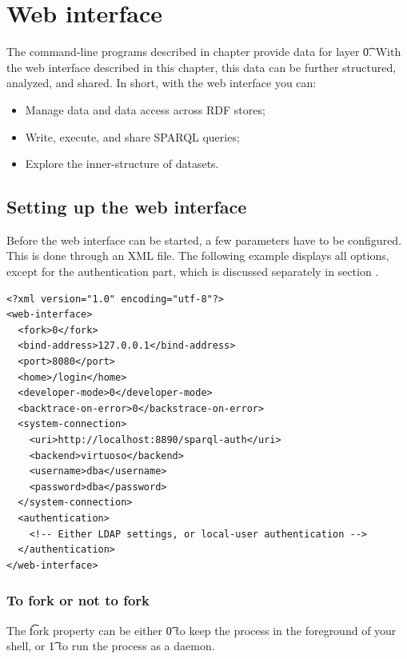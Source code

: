\chapter{Web interface}
\label{chap:web-interface}

  The command-line programs described in chapter 
  provide data for layer \t{0}.  With the web interface described in
  this chapter, this data can be further structured, analyzed, and shared.
  In short, with the web interface you can:
  \begin{itemize}
  \item Manage data and data access across RDF stores;
  \item Write, execute, and share SPARQL queries;
  \item Explore the inner-structure of datasets.
  \end{itemize}

\section{Setting up the web interface}
\label{sec:configuring-sg-web}

  Before the web interface can be started, a few parameters have to be
  configured.  This is done through an XML file.  The following example
  displays all options, except for the authentication part, which is
  discussed separately in section .

\begin{siderules}
\begin{verbatim}
<?xml version="1.0" encoding="utf-8"?>
<web-interface>
  <fork>0</fork>
  <bind-address>127.0.0.1</bind-address>
  <port>8080</port>
  <home>/login</home>
  <developer-mode>0</developer-mode>
  <backtrace-on-error>0</backstrace-on-error>
  <system-connection>
    <uri>http://localhost:8890/sparql-auth</uri>
    <backend>virtuoso</backend>
    <username>dba</username>
    <password>dba</password>
  </system-connection>
  <authentication>
    <!-- Either LDAP settings, or local-user authentication -->
  </authentication>
</web-interface>
\end{verbatim}
\end{siderules}

\subsection{To fork or not to fork}

  The \t{fork} property can be either \t{0} to keep the
   process in the foreground of your shell, or
  \t{1} to run the  process as a daemon.

